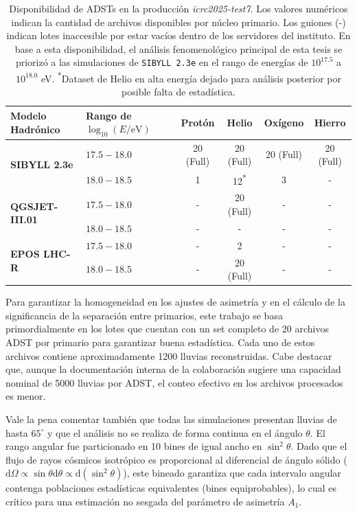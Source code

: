 \begin{table}[htpb]
	\centering
	\begin{tabular}{llcccc}
		\toprule
		\textbf{Modelo Hadrónico} & \textbf{Rango de $\log_{10}(E/\mathrm{eV})$} & \textbf{Protón} & \textbf{Helio} & \textbf{Oxígeno} & \textbf{Hierro} \\
		\midrule
		\multirow{2}{*}{\textbf{SIBYLL 2.3e}} & $17.5 - 18.0$ & 20 (Full) & 20 (Full) & 20 (Full) & 20 (Full) \\
		& $18.0 - 18.5$ & 1 & 12\textsuperscript{*} & 3 & - \\
		\midrule
		\multirow{2}{*}{\textbf{QGSJET-III.01}} & $17.5 - 18.0$ & - & 20 (Full) & - & - \\
		& $18.0 - 18.5$ & - & - & - & - \\
		\midrule
		\multirow{2}{*}{\textbf{EPOS LHC-R}} & $17.5 - 18.0$ & - & 2 & - & - \\
		& $18.0 - 18.5$ & - & 20 (Full) & - & - \\
		\bottomrule
	\end{tabular}
	\caption{Disponibilidad de ADSTs en la producción \textit{icrc2025-test7}. Los valores numéricos indican la cantidad de archivos disponibles por núcleo primario. Los guiones (-) indican lotes inaccesible por estar vacíos dentro de los servidores del instituto. En base a esta disponibilidad, el análisis fenomenológico principal de esta tesis se priorizó a las simulaciones de \texttt{SIBYLL 2.3e} en el rango de energías de $10^{17.5}$ a $10^{18.0}$ eV. \textsuperscript{*}Dataset de Helio en alta energía dejado para análisis posterior por posible falta de estadística.}
	\label{tab:adst_datasets}
\end{table}

Para garantizar la homogeneidad en los ajustes de asimetría y en el cálculo de la significancia de la separación entre primarios, este trabajo se basa primordialmente en los lotes que cuentan con un set completo de 20 archivos ADST por primario para garantizar buena estadística. Cada uno de estos archivos contiene aproximadamente 1200 lluvias reconstruidas. Cabe destacar que, aunque la documentación interna de la colaboración sugiere una capacidad nominal de 5000 lluvias por ADST, el conteo efectivo en los archivos procesados es menor.

Vale la pena comentar también que todas las simulaciones presentan lluvias de hasta $65^\circ$ y que el análisis no se realiza de forma continua en el ángulo $\theta$. El rango angular fue particionado en 10 bines de igual ancho en $\sin^2\theta$. Dado que el flujo de rayos cósmicos isotrópico es proporcional al diferencial de ángulo sólido ($\mathrm{d}\Omega \propto \sin\theta \mathrm{d}\theta \propto \mathrm{d}(\sin^2\theta)$), este bineado garantiza que cada intervalo angular contenga poblaciones estadísticas equivalentes (bines equiprobables), lo cual es crítico para una estimación no sesgada del parámetro de asimetría $A_1$.


